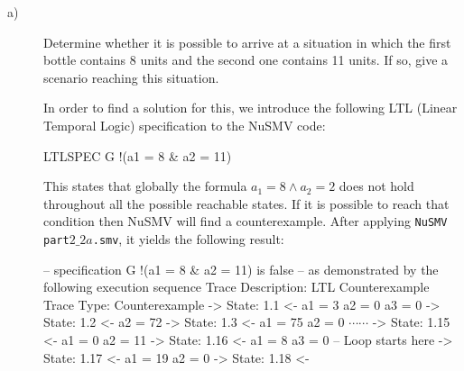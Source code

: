 \begin{description}
  \item[a)] Determine whether it is possible to arrive at a situation in which the first bottle contains 8 units and the second one contains 11 units. If so, give a scenario reaching this situation.

  In order to find a solution for this, we introduce the following LTL (Linear Temporal Logic) specification to the NuSMV code:

  \vspace{2mm}
\selectfont
{\footnotesize
\noindent
LTLSPEC G !(a1 = 8 \& a2 = 11)
}
\selectfont
\vspace{2mm}

  This states that globally the formula $a_1 =8 \wedge a_2 = 2$ does not hold throughout all the possible reachable states. If it is possible to reach that condition then NuSMV will find a counterexample. After applying {\tt NuSMV part$2\_2a$.smv}, it yields the following result:

    \vspace{2mm}
\selectfont
{\footnotesize
\noindent
-- specification  G !(a1 = 8 \& a2 = 11)  is false\newline
-- as demonstrated by the following execution sequence\newline
Trace Description: LTL Counterexample\newline
Trace Type: Counterexample\newline
  -> State: 1.1 <-\newline
    a1 = 3\newline
    a2 = 0\newline
    a3 = 0\newline
  -> State: 1.2 <-\newline
    a2 = 72\newline
  -> State: 1.3 <-\newline
    a1 = 75\newline
    a2 = 0\newline
  $\cdots \cdots$
  \newline
  -> State: 1.15 <-\newline
    a1 = 0\newline
    a2 = 11\newline
  -> State: 1.16 <-\newline
    a1 = 8\newline
    a3 = 0\newline
  -- Loop starts here\newline
  -> State: 1.17 <-\newline
    a1 = 19\newline
    a2 = 0\newline
  -> State: 1.18 <-
}
\selectfont
  \vspace{2mm}


\end{description}
